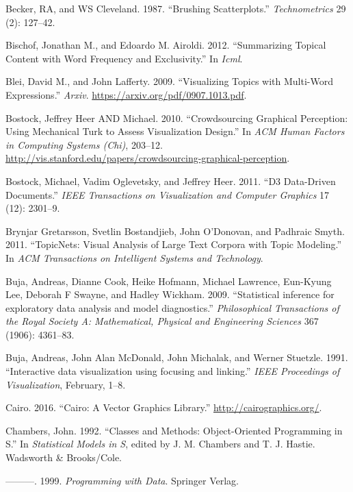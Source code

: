 \documentclass[12pt,]{isuthesis}
\begin{document}
\hypertarget{ref-brushing-scatterplots}{}
Becker, RA, and WS Cleveland. 1987. ``Brushing Scatterplots.''
\emph{Technometrics} 29 (2): 127--42.

\hypertarget{ref-Bischof}{}
Bischof, Jonathan M., and Edoardo M. Airoldi. 2012. ``Summarizing
Topical Content with Word Frequency and Exclusivity.'' In \emph{Icml}.

\hypertarget{ref-Blei-2009}{}
Blei, David M., and John Lafferty. 2009. ``Visualizing Topics with
Multi-Word Expressions.'' \emph{Arxiv}.
\url{https://arxiv.org/pdf/0907.1013.pdf}.

\hypertarget{ref-crowdsourcing-graphical-perception}{}
Bostock, Jeffrey Heer AND Michael. 2010. ``Crowdsourcing Graphical
Perception: Using Mechanical Turk to Assess Visualization Design.'' In
\emph{ACM Human Factors in Computing Systems (Chi)}, 203--12.
\url{http://vis.stanford.edu/papers/crowdsourcing-graphical-perception}.

\hypertarget{ref-d3}{}
Bostock, Michael, Vadim Oglevetsky, and Jeffrey Heer. 2011. ``D3
Data-Driven Documents.'' \emph{IEEE Transactions on Visualization and
Computer Graphics} 17 (12): 2301--9.

\hypertarget{ref-Gretarsson}{}
Brynjar Gretarsson, Svetlin Bostandjieb, John O'Donovan, and Padhraic
Smyth. 2011. ``TopicNets: Visual Analysis of Large Text Corpora with
Topic Modeling.'' In \emph{ACM Transactions on Intelligent Systems and
Technology}.

\hypertarget{ref-Buja:2009hp}{}
Buja, Andreas, Dianne Cook, Heike Hofmann, Michael Lawrence, Eun-Kyung
Lee, Deborah F Swayne, and Hadley Wickham. 2009. ``Statistical inference
for exploratory data analysis and model diagnostics.''
\emph{Philosophical Transactions of the Royal Society A: Mathematical,
Physical and Engineering Sciences} 367 (1906): 4361--83.

\hypertarget{ref-Buja:1991vh}{}
Buja, Andreas, John Alan McDonald, John Michalak, and Werner Stuetzle.
1991. ``Interactive data visualization using focusing and linking.''
\emph{IEEE Proceedings of Visualization}, February, 1--8.

\hypertarget{ref-cairo}{}
Cairo. 2016. ``Cairo: A Vector Graphics Library.''
\url{http://cairographics.org/}.

\hypertarget{ref-S3}{}
Chambers, John. 1992. ``Classes and Methods: Object-Oriented Programming
in S.'' In \emph{Statistical Models in S}, edited by J. M. Chambers and
T. J. Hastie. Wadsworth \& Brooks/Cole.

\hypertarget{ref-Chambers:1999}{}
---------. 1999. \emph{Programming with Data}. Springer Verlag.
\end{document}
